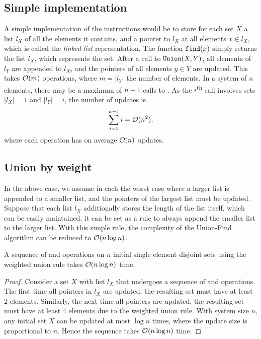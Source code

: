 \subsection{Simple implementation}
A simple implementation of the instructions would be to store for each set $X$ a list $l_X$ of all the elements it contains, and a pointer to $l_X$ at all elements $x\in l_X$, which is called the \emph{linked-list} representation. The function $\texttt{find}(x)$ simply returns the list $l_X$, which represents the set. After a call to $\texttt{Union}(X, Y)$, all elements of $l_Y$ are appended to $l_X$, and the pointers of all elements $y\in Y$ are updated. This takes $\mathcal{O}(m)$ operations, where $m=|l_Y|$ the number of elements. In a system of $n$ elements, there may be a maximum of $n-1$ calls to . As the $i$\textsuperscript{th} call involves sets $|l_X|=1$ and $|l_Y|=i$, the number of updates is 
\begin{equation}
  \sum_{i=1}^{n-1} i = \mathcal{O}(n^2),
\end{equation}
where each  operation has on average $\mathcal{O}(n)$ updates. 

\subsection{Union by weight}
In the above case, we assume in each  the worst case where a larger list is appended to a smaller list, and the pointers of the largest list must be updated. Suppose that each list $l_X$ additionally stores the length of the list itself, which can be easily maintained, it can be set as a rule to always append the smaller list to the larger list. With this simple rule, the complexity of the Union-Find algorithm can be reduced to $\mathcal{O}(n \log n)$. 

\begin{theorem}
  A sequence of  and  operations on $n$ initial single element disjoint sets using the weighted union rule takes $\mathcal{O}(n \log n)$ time. 
\end{theorem}
\begin{proof}
  Consider a set $X$ with list $l_X$ that undergoes a sequence of  and  operations. The first time all pointers in $l_X$ are updated, the resulting set must have at least 2 elements. Similarly, the next time all pointers are updated, the resulting set must have at least 4 elements due to the weighted union rule. With system size $n$, any initial set $X$ can be updated at most $\log n$ times, where the update size is proportional to $n$. Hence the sequence takes $\mathcal{O}(n \log n)$ time. 
\end{proof}

